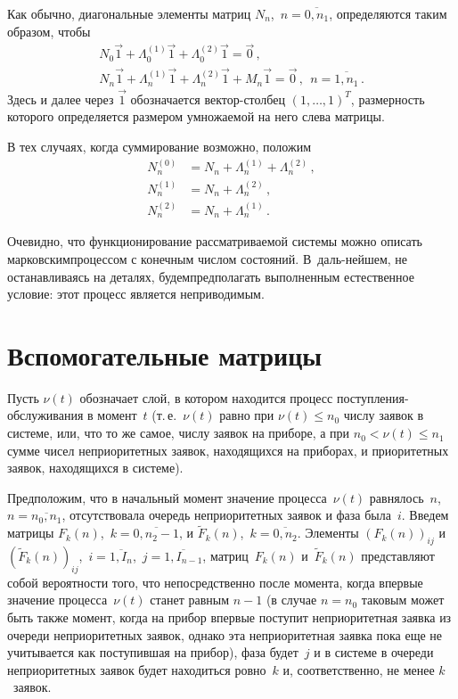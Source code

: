 \begin{multicols}{2}
Как обычно, диагональные элементы матриц $N_n$,\ $n=\overline{0,n_1}$,
определяются таким образом, чтобы
\begin{gather*}
N_0 \vec1 + \Lambda^{(1)}_0 \vec1 + \Lambda^{(2)}_0 \vec1
= \vec 0\,,\\
N_n \vec1 + \Lambda^{(1)}_n \vec1 +
\Lambda^{(2)}_n \vec1 + M_n \vec1
=
\vec 0\,,
\ \ n=\overline{1,n_1}\,.
\end{gather*}
Здесь и далее через $\vec1$ обозначается век\-тор-стол\-бец $(1,\ldots,1)^T$,
размерность которого определяется размером умножаемой на
него слева матрицы.

В тех случаях, когда суммирование возможно, положим
\begin{align*}
N^{(0)}_n &= N_n + \Lambda^{(1)}_n + \Lambda^{(2)}_n\,,\\ 
N^{(1)}_n &= N_n + \Lambda^{(2)}_n\,,\\
N^{(2)}_n &= N_n + \Lambda^{(1)}_n\,.
\end{align*}

Очевидно, что функционирование рас\-смат\-риваемой системы можно
описать марковским\linebreak процессом с конечным числом состояний.
В~даль-\linebreak нейшем, не останавливаясь на деталях, будем\linebreak предполагать
выполненным естественное условие: этот процесс является
неприводимым.

\section{Вспомогательные матрицы}

Пусть $\nu(t)$ обозначает слой, в котором находится процесс
по\-ступ\-ле\-ния-об\-слу\-жи\-ва\-ния в момент~$t$ (т.\,е.\ $\nu(t)$ равно
при $\nu(t)\le n_0$ числу заявок в системе, или, что
то же самое, числу заявок на приборе, а при $n_0<\nu(t)\le n_1$
сумме чисел неприоритетных заявок, находящихся на приборах,
и приоритетных заявок, находящихся в системе).

Предположим, что в начальный момент значение процесса~$\nu(t)$
равнялось~$n$,\ $n=\overline{n_0,n_1}$, отсутствовала
очередь неприоритетных заявок и фаза была~$i$.
Введем матрицы $F_k(n)$,\  $k=\overline{0,n_2-1}$, и
$\tilde F_k(n)$,\ $k=\overline{0,n_2}$.
Элементы $(F_k(n))_{ij}$ и $(\tilde F_k(n))_{ij}$,\ 
$i=\overline{1,I_{n}}$,\  $j=\overline{1,I_{n-1}}$,
мат\-риц~$F_k(n)$ и~$\tilde F_k(n)$ представляют собой
вероятности того, что непосредственно после момента,
когда впервые значение процесса~$\nu(t)$ станет равным $n-1$
(в случае $n=n_0$ таковым может быть также момент,
когда на прибор впервые поступит неприоритетная заявка
из очереди неприоритетных заявок, однако эта неприоритетная
заявка пока еще не учитывается как поступившая на прибор),
фаза будет~$j$ и в системе в очереди неприоритетных заявок
будет находиться ровно~$k$ и, соответственно, не менее
$k$~за\-явок.


\end{multicols}
